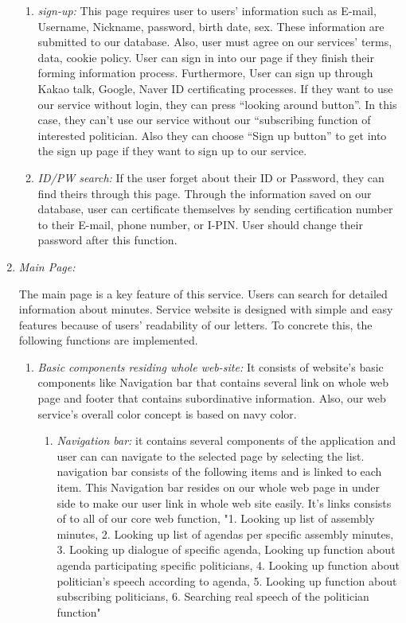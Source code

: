 \documentclass[conference]{IEEEtran}
\begin{document}
\begin{enumerate}
\begin{enumerate}
        \item \textit{sign-up: }This page requires user to users’ information  such as E-mail, Username, Nickname, password, birth date, sex. These information are submitted to our database. Also, user must agree on our services’ terms, data, cookie policy. User can sign in into our page if they finish their forming information process. Furthermore, User can sign up through Kakao talk, Google, Naver ID certificating processes. If they want to use our service without login, they can press “looking around button”. In this case, they can't use our service without our “subscribing function of interested politician. Also they can choose “Sign up button” to get into the sign up page  if they want to sign up to our service.\\
         \item \textit{ID/PW search: }If the user forget about their ID or Password, they can find theirs through this page. Through the information saved on our database, user can certificate themselves by sending certification number to their E-mail,  phone number, or I-PIN. User should change their password after this function.\\
    \end{enumerate}
   
    \item \textit {Main Page: }
 
The main page is a key feature of this service. Users can search for detailed information about minutes. Service website is designed with simple and easy features because of users' readability of our letters. To concrete this, the following functions are implemented.\\

         \begin{enumerate}
    \item \textit{Basic components residing whole web-site:} It consists of website's basic components like Navigation bar that contains several link on whole web page and footer that contains subordinative information. Also, our web service's overall color concept is based on navy color. \\
            \begin{enumerate}
    \item \textit{Navigation bar:} it contains several components of the application and user can can navigate to the selected page by selecting the list. navigation bar consists of the following items and is linked to each item. This Navigation bar resides on our whole web page in under side to make our user link in  whole web site easily. It's links consists of to all of our core web function, "1. Looking up list of assembly minutes, 2. Looking up list of agendas per specific assembly minutes, 3. Looking up dialogue of specific agenda, Looking up function about agenda participating specific politicians, 4. Looking up function about politician's speech according to agenda, 5. Looking up function about subscribing politicians, 6. Searching real speech of the politician function" \\
   

\end{enumerate}
\end{enumerate}
\end{enumerate}
\end{document}

